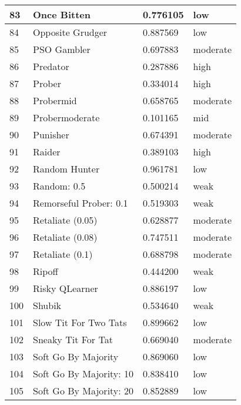 \begin{longtable}{|p{0.5cm}||p{6cm}||p{4cm}||p{2cm}|}
			83  & Once Bitten                 & 0.776105          & low      \\ \hline
			84  & Opposite Grudger            & 0.887569          & low      \\ \hline
			85  & PSO Gambler                 & 0.697883          & moderate \\ \hline
			86  & Predator                    & 0.287886          & high     \\ \hline
			87  & Prober                      & 0.334014          & high     \\ \hline
			88  & Probermid                   & 0.658765          & moderate \\ \hline
			89  & Probermoderate              & 0.101165          & mid      \\ \hline
			90  & Punisher                    & 0.674391          & moderate \\ \hline
			91  & Raider                      & 0.389103          & high     \\ \hline
			92  & Random Hunter               & 0.961781          & low      \\ \hline
			93  & Random: 0.5                 & 0.500214          & weak     \\ \hline
			94  & Remorseful Prober: 0.1      & 0.519303          & weak     \\ \hline
			95  & Retaliate (0.05)            & 0.628877          & moderate \\ \hline
			96  & Retaliate (0.08)            & 0.747511          & moderate \\ \hline
			97  & Retaliate (0.1)             & 0.688798          & moderate \\ \hline
			98  & Ripoff                      & 0.444200          & weak     \\ \hline
			99  & Risky QLearner              & 0.886197          & low      \\ \hline
			100 & Shubik                      & 0.534640          & weak     \\ \hline
			101 & Slow Tit For Two Tats       & 0.899662          & low      \\ \hline
			102 & Sneaky Tit For Tat          & 0.669040          & moderate \\ \hline
			103 & Soft Go By Majority         & 0.869060          & low      \\ \hline
			104 & Soft Go By Majority: 10     & 0.838410          & low      \\ \hline
			105 & Soft Go By Majority: 20     & 0.852889          & low      \\ \hline

\end{longtable}
